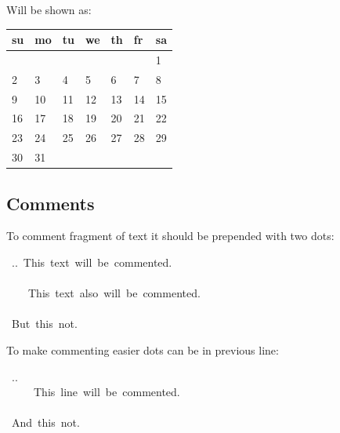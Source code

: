 \documentclass[12pt]{article}
\begin{document}
Will be shown as:

\setlongtables
\begin{center}
\begin{longtable}[c]{|p{}|p{}|p{}|p{}|p{}|p{}|p{}|}\hline

su
&
mo
&
tu
&
we
&
th
&
fr
&
sa

 \\ \hline
\endhead
&
&
&
&
&

&
1
\\ \hline
2
&
3
&
4
&
5
&
6
&
7
&
8
\\ \hline
9
&
10
&
11
&
12
&
13
&
14
&
15
\\ \hline
16
&
17
&
18
&
19
&
20
&
21
&
22
\\ \hline
23
&
24
&
25
&
26
&
27
&
28
&
29
\\ \hline
30
&
31
&
&
&
&
&
\\ \hline
\end{longtable}
\end{center}

\hypertarget{lcomment}{}

\hypertarget{lcomments}{}
\subsection{Comments}

To comment fragment of text it should be prepended with two dots:

\begin{ttfamily}\begin{flushleft}
\mbox{~..~This~text~will~be~commented.}\\
\mbox{}\\
\mbox{~~~~This~text~also~will~be~commented.}\\
\mbox{}\\
\mbox{~But~this~not.}\\
\end{flushleft}\end{ttfamily}

To make commenting easier dots can be in previous line:

\begin{ttfamily}\begin{flushleft}
\mbox{~..}\\
\mbox{~~~~~This~line~will~be~commented.}\\
\mbox{}\\
\mbox{~And~this~not.}\\
\end{flushleft}\end{ttfamily}
\end{document}
